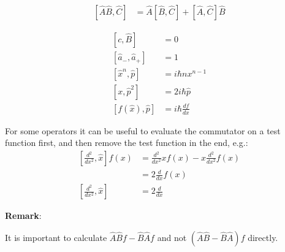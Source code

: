 
\noindent\begin{align*}
    \left[\hat{A}\hat{B},\hat{C}\right] & =\hat{A}\left[\hat{B},\hat{C}\right]+\left[\hat{A},\hat{C}\right]\hat{B}
\end{align*}



\noindent\begin{align*}
    \left[c,\hat B\right]                & =0                     \\
    \left[\hat{a}_{-},\hat{a}_{+}\right] & = 1                    \\
    \left[\hat{x}^n,\hat{p}\right]       & = i \hbar n x^{n-1}    \\
    \left[x,\hat{p}^2\right]             & = 2i\hbar\hat{p}       \\
    \left[f(\hat{x}),\hat{p}\right]      & = i \hbar\frac{df}{dx}
\end{align*}



For some operators it can be useful to evaluate the commutator on a test function first, and then remove the test function in the end, e.g.:
\noindent\begin{align*}
    \left[\frac{d^2}{dx^2}, \hat{x}\right] f(x) & = \frac{d^2}{dx^2} xf(x) - x\frac{d^2}{dx^2}f(x) \\
                                                & = 2\frac{d}{dx} f(x)                             \\
    \left[\frac{d^2}{dx^2}, \hat{x}\right]      & = 2\frac{d}{dx}
\end{align*}

\textbf{Remark}:

It is important to calculate $\widehat{A}\widehat{B}f - \widehat{B}\widehat{A}f$ and not $(\widehat{A}\widehat{B} - \widehat{B}\widehat{A})f$ directly.

